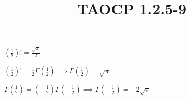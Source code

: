 \documentclass{article}
\title{TAOCP 1.2.5\mbox{-}9}
\begin{document}
\maketitle

\( (\frac{1}{2})! = \frac{\sqrt{\pi}}{2} \)

\( (\frac{1}{2})! = \frac{1}{2} \Gamma(\frac{1}{2}) \implies \Gamma(\frac{1}{2}) = \sqrt{\pi} \)

\( \Gamma(\frac{1}{2}) = (-\frac{1}{2})\Gamma(-\frac{1}{2}) \implies \Gamma(-\frac{1}{2}) = -2\sqrt{\pi} \)
\end{document}
